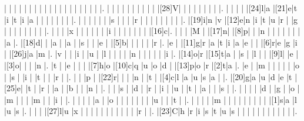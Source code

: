 \documentclass[12pt]{article}
\begin{document}
\begin{Puzzle}{20}{22}
  |{}  |{}  |{}  |{}  |{}  |{}  |{}  |{}  |{}  |{}  |{}  |{}  |{}  |{}  |{}  |{}  |{}  |{}  |{}  |.
  |{}  |{}  |{}  |{}  |{}  |{}  |{}  |{}  |{}  |{}  |[28]V|{}  |{}  |{}  |{}  |{}  |{}  |{}  |{}  |.
  |{}  |{}  |{}  |{}  |[24]l|a   |[21]e|t   |i   |t   |i   |a   |{}  |{}  |{}  |{}  |{}  |{}  |{}  |.
  |{}  |{}  |{}  |{}  |{}  |{}  |s   |{}  |{}  |{}  |r   |{}  |{}  |{}  |{}  |{}  |{}  |{}  |{}  |.
  |[19]i|n   |v   |[12]e|n   |i   |t   |u   |r   |{}  |g   |{}  |{}  |{}  |{}  |{}  |{}  |{}  |{}  |.
  |{}  |{}  |{}  |x   |{}  |{}  |{}  |{}  |{}  |{}  |i   |{}  |{}  |{}  |{}  |{}  |{}  |{}  |[16]c|.
  |{}  |{}  |{}  |M   |{}  |[17]n|{}  |[8]p|{}  |{}  |n   |{}  |{}  |{}  |{}  |{}  |{}  |{}  |a   |.
  |[18]d|{}  |{}  |a   |{}  |a   |{}  |s   |{}  |{}  |e   |{}  |[5]b|{}  |{}  |{}  |{}  |{}  |r   |.
  |e   |{}  |[11]g|r   |a   |t   |i   |a   |e   |{}  |{}  |[6]r|e   |g   |i   |{}  |[26]j|a   |m   |.
  |v   |{}  |{}  |i   |{}  |u   |{}  |l   |{}  |{}  |{}  |{}  |n   |{}  |{}  |{}  |{}  |{}  |i   |.
  |[14]o|r   |[15]t|a   |{}  |s   |{}  |l   |{}  |{}  |[9]l|{}  |e   |{}  |[3]o|{}  |{}  |{}  |n   |.
  |t   |{}  |e   |{}  |{}  |{}  |[7]h|o   |[10]c|q   |u   |o   |d   |{}  |[13]p|o   |r   |[2]t|a   |.
  |e   |{}  |m   |{}  |{}  |{}  |{}  |{}  |o   |{}  |s   |{}  |i   |{}  |t   |{}  |{}  |r   |{}  |.
  |{}  |{}  |p   |{}  |[22]r|{}  |{}  |{}  |n   |{}  |t   |{}  |[4]c|l   |a   |u   |s   |a   |{}  |.
  |[20]g|a   |u   |d   |e   |t   |[25]e|{}  |t   |{}  |r   |{}  |a   |{}  |b   |{}  |{}  |n   |{}  |.
  |{}  |{}  |s   |{}  |d   |{}  |r   |{}  |i   |{}  |u   |{}  |t   |{}  |a   |{}  |{}  |s   |{}  |.
  |{}  |{}  |{}  |{}  |d   |{}  |g   |{}  |o   |{}  |m   |{}  |{}  |{}  |m   |{}  |{}  |i   |{}  |.
  |{}  |{}  |{}  |{}  |a   |{}  |o   |{}  |{}  |{}  |{}  |{}  |{}  |{}  |u   |{}  |{}  |t   |{}  |.
  |{}  |{}  |{}  |{}  |m   |{}  |{}  |{}  |{}  |{}  |{}  |{}  |{}  |{}  |[1]s|a   |l   |u   |s   |.
  |{}  |{}  |{}  |[27]l|u   |x   |{}  |{}  |{}  |{}  |{}  |{}  |{}  |{}  |{}  |{}  |{}  |r   |{}  |.
  |[23]C|h   |r   |i   |s   |t   |u   |s   |{}  |{}  |{}  |{}  |{}  |{}  |{}  |{}  |{}  |{}  |{}  |.
\end{Puzzle}
\end{document}
